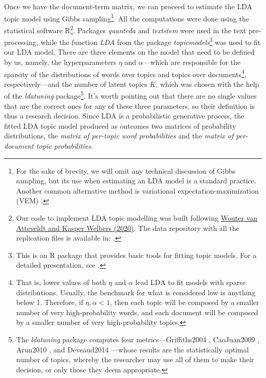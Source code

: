 Once we have the document-term matrix, we can proceed to estimate the LDA topic model using Gibbs sampling\footnote{For the sake of brevity, we will omit any technical discussion of Gibbs sampling, but its use when estimating an LDA model is a standard practice. Another common alternative method is variational expectation-maximization (VEM) \citep{grun_topicmodels_2011}.}. All the computations were done using the statistical software R\footnote{Our code to implement LDA topic modelling was built following \href{https://github.com/ccs-amsterdam/r-course-material/blob/master/tutorials/r_text_lda.md}{Wouter van Atteveldt and Kasper Welbers (2020)}. The data repository with all the replication files is available in: .}. Packages \textit{quanteda} and \textit{textstem} were used in the text pre-processing, while the function \textit{LDA} from the package \textit{topicmodels}\footnote{This is an R package that provides basic tools for fitting topic models. For a detailed presentation, see \cite{grun_topicmodels_2011}.} was used to fit our LDA model. There are three elements on the model that need to be defined by us, namely, the hyperparameters $\eta$ and $\alpha$---which are responsible for the sparsity of the distributions of words over topics and topics over documents\footnote{That is, lower values of both $\eta$ and $\alpha$ lead LDA to fit models with sparse distributions. Usually, the benchmark for what is considered low is anything below 1. Therefore, if $\eta, \alpha < 1$, then each topic will be composed by a smaller number of very high-probability words, and each document will be composed by a smaller number of very high-probability topics.}, respectively---and the number of latent topics $K$, which was chosen with the help of the \textit{ldatuning} package\footnote{The \textit{ldatuning} package computes four metrics---Griffiths2004 \citep{griffiths_finding_2004}, CaoJuan2009 \citep{cao_density-based_2009}, Arun2010 \citep{arun_finding_2010}, and Deveaud2014 \citep{deveaud_accurate_2014}---whose results are the statistically optimal number of topics, whereby the researcher may use all of them to make their decision, or only those they deem appropriate.}. It's worth pointing out that there are no single values that are the correct ones for any of these three parameters, so their definition is thus a research decision. Since LDA is a probabilistic generative process, the fitted LDA topic model produced as outcomes two matrices of probability distributions, the \textit {matrix of per-topic word probabilities} and the \textit{matrix of per-document topic probabilities}. 

